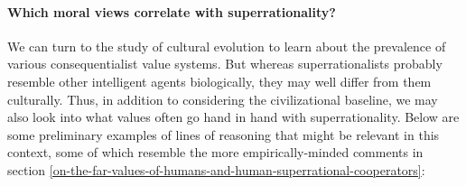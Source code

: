 \paragraph{Which moral views correlate with
superrationality?}\label{which-moral-views-correlate-with-superrationality}

We can turn to the study of cultural evolution to learn about the
prevalence of various consequentialist value systems. But whereas
superrationalists probably resemble other intelligent agents
biologically, they may well differ from them culturally. Thus, in
addition to considering the civilizational baseline, we may also look
into what values often go hand in hand with superrationality. Below are
some preliminary examples of lines of reasoning that might be relevant
in this context, some of which resemble the more empirically-minded
comments in section \ref{on-the-far-values-of-humans-and-human-superrational-cooperators}:

